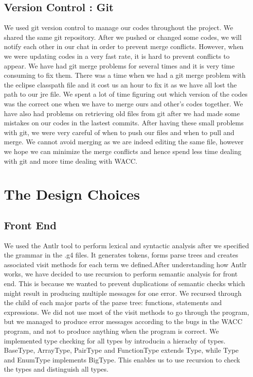 \documentclass[a4paper]{article}
\theoremstyle{definition}
\begin{document}
\subsection{Version Control : Git}
We used git version control to manage our codes throughout the project. We shared the same git repository. After we pushed or changed some codes, we will notify each other in our chat in order to prevent merge conflicts. However, when we were updating codes in a very fast rate, it is hard to prevent conflicts to appear.
We have had git merge problems for several times and it is very time consuming to fix them. There was a time when we had a git merge problem with the eclipse classpath file and it cost us an hour to fix it as we have all lost the path to our jre file. We spent a lot of time figuring out which version of the codes was the correct one when we have to merge ours and other's codes together. We have also had problems on retrieving old files from git after we had made some mistakes on our codes in the lastest commits. After having these small problems with git, we were very careful of when to push our files and when to pull and merge. We cannot avoid merging as we are indeed editing the same file, however we hope we can minimize the merge conflicts and hence spend less time dealing with git and more time dealing with WACC.


\section{The Design Choices}
\subsection{Front End}
We used the Antlr tool to perform lexical and syntactic analysis after we specified the grammar in the .g4 files. It generates tokens, forms parse trees and creates associated visit methods for each term we defined.After understanding how Antlr works, we have decided to use recursion to perform semantic analysis for front end. This is because we wanted to prevent duplications of semantic checks which might result in producing multiple messages for one error.
We recursed through the child of each major parts of the parse tree: functions, statements and expressions. We did not use most of the visit methods to go through the program, but we managed to produce error messages according to the bugs in the WACC program, and not to produce anything when the program is correct. We implemented type checking for all types by introducin a hierachy of types. BaseType, ArrayType, PairType and FunctionType extends Type, while Type and EnumType implements BigType. This enables us to use recursion to check the types and distinguish all types.
\end{document}
